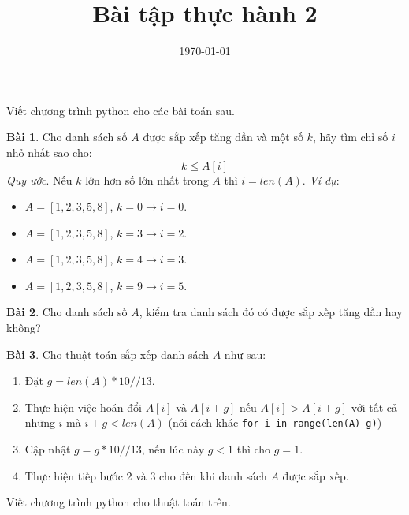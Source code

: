 \documentclass[12pt, a4paper]{article}
\title{Bài tập thực hành 2}
\date{\today}
\author{}
\begin{document}
    \onehalfspacing
    \maketitle
    Viết chương trình python cho các bài toán sau.

    \textbf{Bài 1}. Cho danh sách số $A$ được sắp xếp tăng dần và một số $k$, hãy tìm chỉ số $i$ nhỏ nhất sao cho:
    $$k \leq A[i]$$
    \textit{Quy ước}. Nếu $k$ lớn hơn số lớn nhất trong $A$ thì $i = len(A)$.
    \textit{Ví dụ}:
    \begin{itemize}
        \item $A = [1, 2, 3, 5, 8]$, $k = 0 \rightarrow i = 0$.
        \item $A = [1, 2, 3, 5, 8]$, $k = 3 \rightarrow i = 2$.
        \item $A = [1, 2, 3, 5, 8]$, $k = 4 \rightarrow i = 3$.
        \item $A = [1, 2, 3, 5, 8]$, $k = 9 \rightarrow i = 5$.
    \end{itemize}

    \textbf{Bài 2}. Cho danh sách số $A$, kiểm tra danh sách đó có được sắp xếp tăng dần hay không?

    \textbf{Bài 3}. Cho thuật toán sắp xếp danh sách $A$ như sau:
    \begin{enumerate}
        \item Đặt $g = len(A) * 10 // 13$.
        \item Thực hiện việc hoán đổi $A[i]$ và $A[i+g]$ nếu $A[i] > A[i+g]$ với tất cả những $i$ mà $i + g < len(A)$ (nói cách khác \texttt{for i in range(len(A)-g)})
        \item Cập nhật $g = g * 10 // 13$, nếu lúc này $g < 1$ thì cho $g = 1$.
        \item Thực hiện tiếp bước 2 và 3 cho đến khi danh sách $A$ được sắp xếp. 
    \end{enumerate}
    Viết chương trình python cho thuật toán trên.
\end{document}

